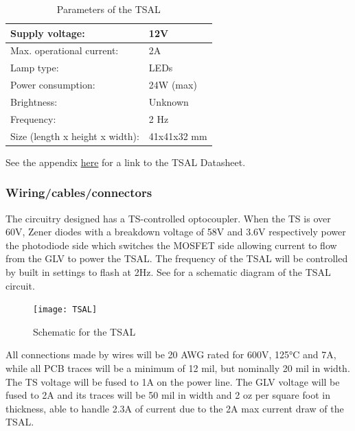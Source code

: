 \documentclass{article}
\begin{document}
	\begin{table}[H]
	    \centering
	    \begin{tabular}{|l|l|}
	    \hline
	    Supply voltage: & 12V \\ \hline
	    Max. operational current: &  2A\\ \hline
	    Lamp type: & LEDs \\ \hline
	    Power consumption: & 24W (max)\\ \hline
	    Brightness: & Unknown\\ \hline
	    Frequency: & 2 Hz \\ \hline
	    Size (length x height x width): & 41x41x32 mm \\ \hline
	    \end{tabular}
	    \caption{Parameters of the TSAL}
	    \label{TSALparameters}
	\end{table}
	
See the appendix \hyperlink{TSALdatasheet}{here} for a link to the TSAL Datasheet.

\subsubsection{Wiring/cables/connectors}
The circuitry designed has a TS-controlled optocoupler. When the TS is over 60V, Zener diodes with a breakdown voltage of 58V and 3.6V respectively power the photodiode side which switches the MOSFET side allowing current to flow from the GLV to power the TSAL. The frequency of the TSAL will be controlled by built in settings to flash at 2Hz. See  for a schematic diagram of the TSAL circuit.

\begin{figure}[h]
\centering
\texttt{[image: TSAL]}
\caption{Schematic for the TSAL}
\label{fig:TSALcircuit}
\end{figure}

All connections made by wires will be 20 AWG rated for 600V, 125°C and 7A, while all PCB traces will be a minimum of 12 mil, but nominally 20 mil in width. The TS voltage will be fused to 1A on the power line. The GLV voltage will be fused to 2A and its traces will be 50 mil in width and 2 oz per square foot in thickness, able to handle 2.3A of current due to the 2A max current draw of the TSAL.
\end{document}
